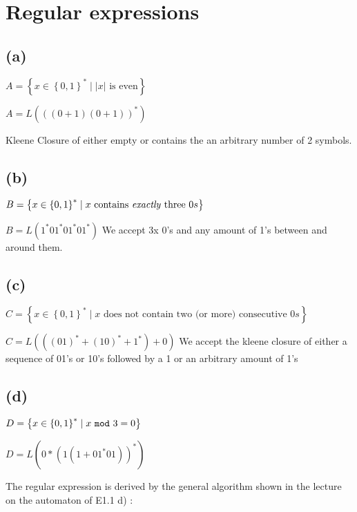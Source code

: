 



\section{Regular expressions}

\subsection{(a)}

$A = \left\{ x \in \left\{0,1\right\} ^{*} \mid \lvert x \rvert \text{ is even} \right\}$

$A = L(((0+1)(0+1))^*)$

Kleene Closure of either empty or contains the an arbitrary number of 2 symbols.

\subsection{(b)}

$B = \left\{ x \in \left\{0,1\right\} ^{*} \mid x \text{ contains \textit{exactly} three } 0s \right\}$

$B = L(1^*01^*01^*01^*)$
We accept 3x 0's and any amount of 1's between and around them.

\subsection{(c)}

$C = \left\{ x \in \left\{0,1\right\} ^{*} \mid x \text{ does not contain two (or more) consecutive } 0s \right\}$

$C = L(((01)^*+(10)^*+1^*) + 0)$
We accept the kleene closure of either a sequence of 01's or 10's followed by a 1 or an arbitrary amount of 1's 
\subsection{(d)}

$D = \left\{ x \in \left\{0,1\right\} ^{*} \mid x \text{ \texttt{mod} } 3 = 0 \right\}$

$D = L(0*(1(1+01^*01))^*)$

The regular expression is derived by the general algorithm shown in the lecture on the automaton of E1.1 d) :


